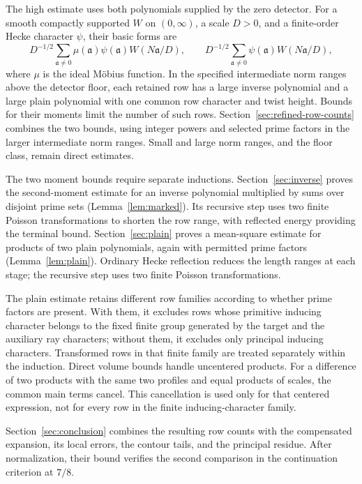 \documentclass[11pt,a4paper]{article}
\numberwithin{equation}{section}
\numberwithin{figure}{section}
\theoremstyle{definition}
\theoremstyle{remark}
\begin{document}
The high estimate uses both polynomials supplied by the zero detector.
For a smooth compactly supported $W$ on $(0,\infty)$, a scale $D>0$,
and a finite-order Hecke character $\psi$, their basic forms are
\[
 D^{-1/2}\sum_{\mathfrak a\ne0}\mu(\mathfrak a)\psi(\mathfrak a)
       W(N\mathfrak a/D),\qquad
 D^{-1/2}\sum_{\mathfrak a\ne0}\psi(\mathfrak a)W(N\mathfrak a/D),
\]
where $\mu$ is the ideal M\"obius function. In the specified intermediate
norm ranges above the detector floor, each retained row has a large inverse polynomial and a large plain
polynomial with one common row character and twist height. Bounds for
their moments limit the number of such rows. Section~\ref{sec:refined-row-counts}
combines the two bounds, using integer powers and selected prime factors
in the larger intermediate norm ranges. Small and large norm ranges,
and the floor class, remain direct estimates.

The two moment bounds require separate inductions.
Section~\ref{sec:inverse} proves the second-moment estimate for an inverse
polynomial multiplied by sums over disjoint prime sets
(Lemma~\ref{lem:marked}). Its recursive step uses two finite Poisson
transformations to shorten the row range, with reflected energy providing
the terminal bound. Section~\ref{sec:plain} proves a mean-square estimate
for products of two plain polynomials, again with permitted prime factors
(Lemma~\ref{lem:plain}). Ordinary Hecke reflection reduces the length
ranges at each stage; the recursive step uses two finite Poisson
transformations.

The plain estimate retains different row families according to whether
prime factors are present. With them, it excludes rows whose primitive
inducing character belongs to the fixed finite group generated by the
target and the auxiliary ray characters; without them, it excludes only
principal inducing characters. Transformed rows in that finite family
are treated separately within the induction. Direct volume bounds handle
uncentered products. For a difference of two products with the same two
profiles and equal products of scales, the common main terms cancel.
This cancellation is used only for that centered expression, not for every
row in the finite inducing-character family.

Section~\ref{sec:conclusion} combines the resulting row counts with the
compensated expansion, its local errors, the contour tails, and the
principal residue. After normalization, their bound verifies the second
comparison in the continuation criterion at $7/8$.
\end{document}
